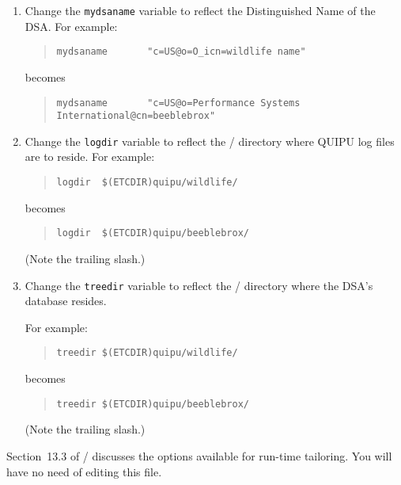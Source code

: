 \begin{enumerate}
\item	Change the \verb"mydsaname" variable to reflect the Distinguished Name
	of the DSA.
	For example:
\begin{quote}\small\begin{verbatim}
mydsaname       "c=US@o=O_icn=wildlife name"
\end{verbatim}\end{quote}
	becomes
\begin{quote}\smaller\begin{verbatim}
mydsaname       "c=US@o=Performance Systems International@cn=beeblebrox"
\end{verbatim}\end{quote}

\item	Change the \verb"logdir" variable to reflect the \unix/ directory where
QUIPU log files are to reside.
	For example:
\begin{quote}\small\begin{verbatim}
logdir  $(ETCDIR)quipu/wildlife/
\end{verbatim}\end{quote}
	becomes
\begin{quote}\small\begin{verbatim}
logdir  $(ETCDIR)quipu/beeblebrox/
\end{verbatim}\end{quote}
(Note the trailing slash.)

\item	Change the \verb"treedir" variable to reflect the \unix/ directory
where the DSA's database resides.

	For example:
\begin{quote}\small\begin{verbatim}
treedir $(ETCDIR)quipu/wildlife/
\end{verbatim}\end{quote}
	becomes
\begin{quote}\small\begin{verbatim}
treedir $(ETCDIR)quipu/beeblebrox/
\end{verbatim}\end{quote}
(Note the trailing slash.)
\end{enumerate}

Section~13.3 of \volfive/ discusses the options available for run-time
tailoring.
You will have no need of editing this file.

